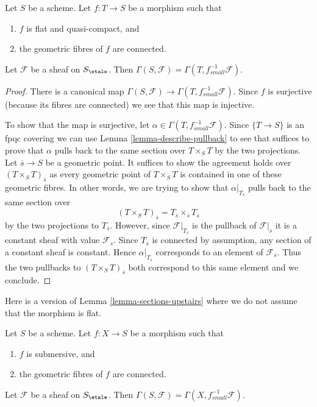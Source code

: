 \begin{lemma}
\label{lemma-sections-upstairs}
Let $S$ be a scheme. Let $f : T \to S$ be a morphism such that
\begin{enumerate}
\item $f$ is flat and quasi-compact, and
\item the geometric fibres of $f$ are connected.
\end{enumerate}
Let $\mathcal{F}$ be a sheaf on $S_\etale$.
Then $\Gamma(S, \mathcal{F}) = \Gamma(T, f^{-1}_{small}\mathcal{F})$.
\end{lemma}

\begin{proof}
There is a canonical map
$\Gamma(S, \mathcal{F}) \to \Gamma(T, f_{small}^{-1}\mathcal{F})$.
Since $f$ is surjective (because its fibres are connected) we see that
this map is injective.

\medskip\noindent
To show that the map is surjective, let
$\alpha \in \Gamma(T, f_{small}^{-1}\mathcal{F})$.
Since $\{T \to S\}$ is an fpqc covering we can use
Lemma \ref{lemma-describe-pullback} to see that suffices to prove that
$\alpha$ pulls back to the same section over $T \times_S T$ by the
two projections. Let $\overline{s} \to S$ be a geometric point.
It suffices to show the agreement holds over $(T \times_S T)_{\overline{s}}$
as every geometric point of $T \times_S T$ is contained in one of
these geometric fibres. In other words, we are trying to show that
$\alpha|_{T_{\overline{s}}}$ pulls back to the same section over
$$
(T \times_S T)_{\overline{s}} =
T_{\overline{s}} \times_{\overline{s}} T_{\overline{s}}
$$
by the two projections to $T_{\overline{s}}$.
However, since $\mathcal{F}|_{T_{\overline{s}}}$ is the
pullback of $\mathcal{F}|_{\overline{s}}$ it is a constant sheaf
with value $\mathcal{F}_{\overline{s}}$. Since $T_{\overline{s}}$
is connected by assumption, any section of a constant sheaf is constant.
Hence $\alpha|_{T_{\overline{s}}}$ corresponds to an element
of $\mathcal{F}_{\overline{s}}$. Thus the two pullbacks to
$(T \times_S T)_{\overline{s}}$ both
correspond to this same element and we conclude.
\end{proof}

\noindent
Here is a version of Lemma \ref{lemma-sections-upstairs}
where we do not assume that the morphism is flat.

\begin{lemma}
\label{lemma-sections-upstairs-submersive}
Let $S$ be a scheme. Let $f : X \to S$ be a morphism such that
\begin{enumerate}
\item $f$ is submersive, and
\item the geometric fibres of $f$ are connected.
\end{enumerate}
Let $\mathcal{F}$ be a sheaf on $S_\etale$.
Then $\Gamma(S, \mathcal{F}) = \Gamma(X, f^{-1}_{small}\mathcal{F})$.
\end{lemma}

